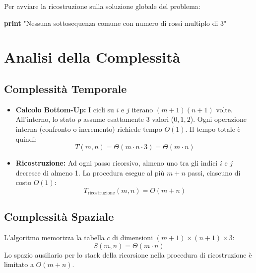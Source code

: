 Per avviare la ricostruzione sulla soluzione globale del problema:
\begin{algorithmic}[1]
\State \textbf{print} "Nessuna sottosequenza comune con numero di rossi multiplo di 3"
\Else
\State {}
\EndIf
\end{algorithmic}\section{Analisi della Complessità}\subsection{Complessità Temporale}
\begin{itemize}
\item \textbf{Calcolo Bottom-Up:} I cicli su $i$ e $j$ iterano $(m+1)(n+1)$ volte. All'interno, lo stato $p$ assume esattamente 3 valori ($0, 1, 2$). Ogni operazione interna (confronto o incremento) richiede tempo $O(1)$. Il tempo totale è quindi:
$$T(m, n) = \Theta(m \cdot n \cdot 3) = \Theta(m \cdot n)$$
\item \textbf{Ricostruzione:} Ad ogni passo ricorsivo, almeno uno tra gli indici $i$ e $j$ decresce di almeno 1. La procedura esegue al più $m + n$ passi, ciascuno di costo $O(1)$:
$$T_{\text{ricostruzione}}(m, n) = O(m + n)$$
\end{itemize}\subsection{Complessità Spaziale}
L'algoritmo memorizza la tabella $c$ di dimensioni $(m + 1) \times (n + 1) \times 3$:
$$S(m, n) = \Theta(m \cdot n)$$
Lo spazio ausiliario per lo stack della ricorsione nella procedura di ricostruzione è limitato a $O(m + n)$.